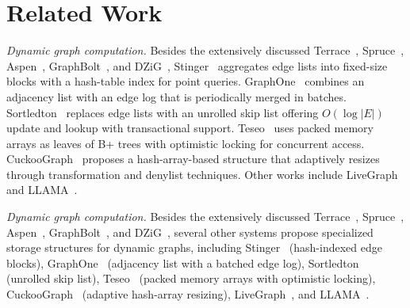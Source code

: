 \section{Related Work}
\label{sec: related work}

\begin{maybecut}
\textit{Dynamic graph computation.}
Besides the extensively discussed Terrace~\cite{pandey2021terrace},
Spruce~\cite{shi2024spruce}, Aspen~\cite{dhulipala2019low},
GraphBolt~\cite{mariappan2019graphbolt}, and DZiG~\cite{mariappan2021dzig},
Stinger~\cite{ediger2012stinger} aggregates edge lists into
fixed-size blocks with a hash-table index for point queries.
GraphOne~\cite{kumar2020graphone} combines an adjacency list with
an edge log that is periodically merged in batches.
Sortledton~\cite{fuchs2023sortledton} replaces edge lists with an
unrolled skip list offering $O(\log|E|)$ update and lookup with
transactional support.
Teseo~\cite{de2021teseo} uses packed memory arrays as leaves of
B+ trees with optimistic locking for concurrent access.
CuckooGraph~\cite{fan2025cuckoograph} proposes a hash-array-based
structure that adaptively resizes through transformation and denylist
techniques.
Other works include LiveGraph~\cite{zhu2019livegraph} and
LLAMA~\cite{macko2015llama}.
\end{maybecut}
\begin{fixed}
\textit{Dynamic graph computation.}
Besides the extensively discussed Terrace~\cite{pandey2021terrace},
Spruce~\cite{shi2024spruce}, Aspen~\cite{dhulipala2019low},
GraphBolt~\cite{mariappan2019graphbolt}, and DZiG~\cite{mariappan2021dzig},
several other systems propose specialized storage structures for dynamic
graphs, including Stinger~\cite{ediger2012stinger} (hash-indexed edge
blocks), GraphOne~\cite{kumar2020graphone} (adjacency list with a batched
edge log), Sortledton~\cite{fuchs2023sortledton} (unrolled skip list),
Teseo~\cite{de2021teseo} (packed memory arrays with optimistic locking),
CuckooGraph~\cite{fan2025cuckoograph} (adaptive hash-array resizing),
LiveGraph~\cite{zhu2019livegraph}, and LLAMA~\cite{macko2015llama}.
\end{fixed}



